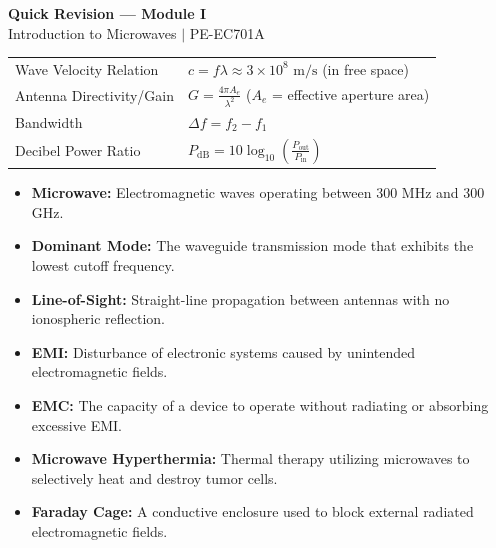\documentclass[12pt,a4paper]{article}
\renewcommand{\arraystretch}{1.45}
\begin{document}
\newpage
\begin{center}
  {\large\bfseries\color{myred} Quick Revision --- Module I}\\[3pt]
  {\small\color{mydark} Introduction to Microwaves $|$ PE-EC701A}
\end{center}
\noindent{\color{myred}\rule{\linewidth}{1.2pt}}
\vspace{4pt}

\begin{tcolorbox}[formulabox, title={\textbf{Key Formulas at a Glance}}]
\renewcommand{\arraystretch}{1.3}
\begin{tabularx}{\linewidth}{B{4.5cm} X}Wave Velocity Relation  & $c = f \lambda \approx 3 \times 10^8 \text{ m/s}$ (in free space) \\[4pt]
Antenna Directivity/Gain & $G = \frac{4\pi A_e}{\lambda^2}$ \quad ($A_e$ = effective aperture area) \\[4pt]
Bandwidth               & $\Delta f = f_2 - f_1$ \\[4pt]
Decibel Power Ratio     & $P_{\text{dB}} = 10 \log_{10}\left(\frac{P_{\text{out}}}{P_{\text{in}}}\right)$
\end{tabularx}
\end{tcolorbox}

\begin{tcolorbox}[defbox, title={\textbf{One-Line Definitions}}]
\begin{itemize}[leftmargin=*, itemsep=2.5pt, topsep=0pt]
  \item \textbf{Microwave:} Electromagnetic waves operating between 300 MHz and 300 GHz.
  \item \textbf{Dominant Mode:} The waveguide transmission mode that exhibits the lowest cutoff frequency.
  \item \textbf{Line-of-Sight:} Straight-line propagation between antennas with no ionospheric reflection.
  \item \textbf{EMI:} Disturbance of electronic systems caused by unintended electromagnetic fields.
  \item \textbf{EMC:} The capacity of a device to operate without radiating or absorbing excessive EMI.
  \item \textbf{Microwave Hyperthermia:} Thermal therapy utilizing microwaves to selectively heat and destroy tumor cells.
  \item \textbf{Faraday Cage:} A conductive enclosure used to block external radiated electromagnetic fields.
\end{itemize}
\end{tcolorbox}
\end{document}
